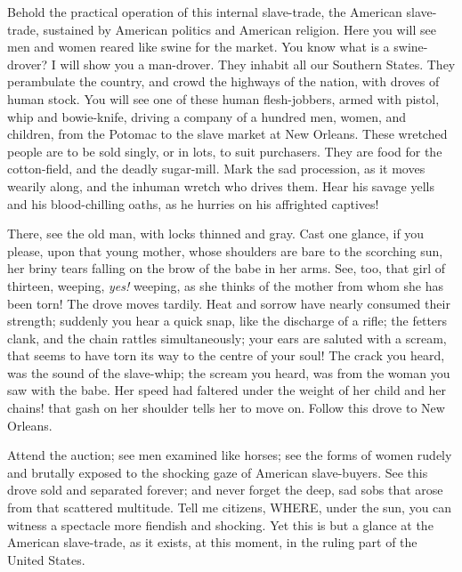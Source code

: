 Behold the practical operation of this internal slave-trade, the American slave-trade, sustained by American politics and American religion. Here you will see men and women reared like swine for the market. You know what is a swine-drover? I will show you a man-drover. They inhabit all our Southern States. They perambulate the country, and crowd the highways of the nation, with droves of human stock. You will see one of these human flesh-jobbers, armed with pistol, whip and bowie-knife, driving a company of a hundred men, women, and children, from the Potomac to the slave market at New Orleans. These wretched people are to be sold singly, or in lots, to suit purchasers. They are food for the cotton-field, and the deadly sugar-mill. Mark the sad procession, as it moves wearily along, and the inhuman wretch who drives them. Hear his savage yells and his blood-chilling oaths, as he hurries on his affrighted captives!\par

There, see the old man, with locks thinned and gray. Cast one glance, if you please, upon that young mother, whose shoulders are bare to the scorching sun, her briny tears falling on the brow of the babe in her arms. See, too, that girl of thirteen, weeping, \textit{yes!} weeping, as she thinks of the mother from whom she has been torn! The drove moves tardily. Heat and sorrow have nearly consumed their strength; suddenly you hear a quick snap, like the discharge of a rifle; the fetters clank, and the chain rattles simultaneously; your ears are saluted with a scream, that seems to have torn its way to the centre of your soul! The crack you heard, was the sound of the slave-whip; the scream you heard, was from the woman you saw with the babe. Her speed had faltered under the weight of her child and her chains! that gash on her shoulder tells her to move on. Follow this drove to New Orleans.\par

Attend the auction; see men examined like horses; see the forms of women rudely and brutally exposed to the shocking gaze of American slave-buyers. See this drove sold and separated forever; and never forget the deep, sad sobs that arose from that scattered multitude. Tell me citizens, WHERE, under the sun, you can witness a spectacle more fiendish and shocking. Yet this is but a glance at the American slave-trade, as it exists, at this moment, in the ruling part of the United States.\par

